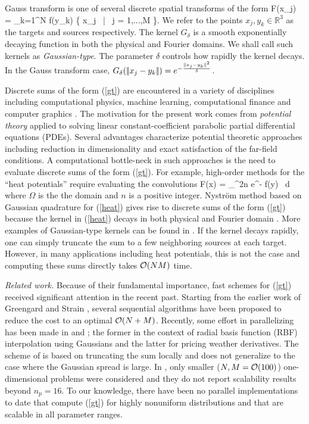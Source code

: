 
Gauss transform is one of several discrete spatial transforms of the form 
%
\beq F(x_j) = \sum_{k=1}^N  f(y_k) \quad {} \quad \{ x_j \, | \, j = 1,...,M \}.  \label{gt} \eeq
%
We refer to the points $ x_j, y_k \in \mathbb{R}^3 $ as the targets and sources respectively. The kernel $G_\delta$ is a
 smooth exponentially decaying function in both the physical and Fourier domains. We shall call such kernels as {\em Gaussian-type}.
  The parameter $\delta$ controls how rapidly the kernel decays.  In the Gauss transform case, $G_\delta (|\!| x_j - y_k |\!|) = e^{-\frac{|\!| x_j - y_k |\!|^2}{\delta}}$. 

Discrete sums of the form (\ref{gt}) are encountered in a variety of disciplines including computational physics,
 machine learning, computational finance and computer graphics \cite{strain94adap, elgammal03, broadie03, kim05, veerapaneni08}. The
 motivation for the present work comes from {\em potential theory} \cite{kress99} applied to  solving linear constant-coefficient
 parabolic partial differential equations (PDEs). Several advantages characterize potential theoretic approaches including reduction
 in dimensionality and exact satisfaction of the far-field conditions. A computational bottle-neck in such approaches is the need to 
 evaluate discrete sums of the form (\ref{gt}). For example, high-order methods for the ``heat potentials'' require evaluating the convolutions \cite{li09, skv09}
% 
\beq F(x) = \int_\Omega {}^{2n} e^{-} f(y) \, d\Omega \label{heat} \eeq
% 
where $\Omega$ is the the domain and $n$ is a positive integer. Nystr\"{o}m method based on Gaussian quadrature for (\ref{heat}) 
gives rise to discrete sums of the form (\ref{gt}) because the kernel in (\ref{heat}) decays in both physical and Fourier 
domain \cite{fggt}. More examples of Gaussian-type kernels can be found in \cite{victor03}. If the kernel decays rapidly, one 
can simply truncate the sum to a few neighboring sources at each target. However, in many applications including heat potentials, this
 is not the case and computing these sums directly takes $\mathcal{O}(NM)$ time. 

{\em Related work.} Because of their fundamental importance, fast schemes for (\ref{gt}) received significant attention in 
the recent past. Starting from the earlier work of Greengard and Strain \cite{fgt}, several sequential
 algorithms \cite{greengard98, sun02, duraiswami03, tausch09, fggt} have been proposed to reduce the cost to an optimal $\mathcal{O}(N+M)$. Recently,
  some effort in parallelizing has been made in \cite{rio09} and \cite{yusaku06}; the former in the context of radial basis 
  function (RBF) interpolation using Gaussians and the latter for pricing weather derivatives. The scheme of \cite{rio09} is based on 
  truncating the sum locally and does not generalize to the case where the Gaussian spread is large. In \cite{yusaku06}, only
   smaller ($N, M = \mathcal{O}(100)$) one-dimensional problems were considered and they do not report scalability results beyond $n_p = 16$. 
To our knowledge, there have been no parallel implementations to date that compute (\ref{gt}) for highly nonuniform
 distributions and that are scalable in all parameter ranges. 

